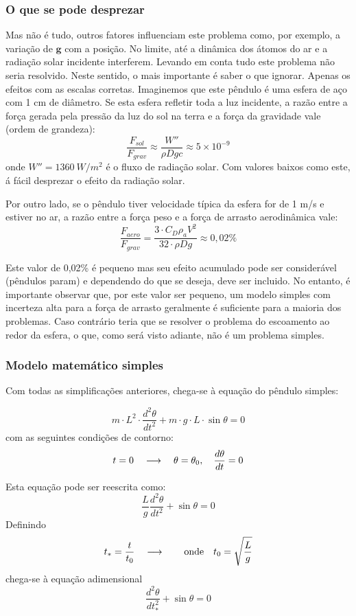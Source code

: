 \subsubsection{O que se pode desprezar}
Mas não é tudo, outros fatores influenciam este problema como, por exemplo, a variação de $\textbf{g}$ com a posição. No limite, até a dinâmica dos átomos do ar e a radiação solar incidente interferem. Levando em conta tudo este problema não seria resolvido. Neste sentido, o mais importante é saber o que ignorar. Apenas os efeitos com as escalas corretas. Imaginemos que este pêndulo é uma esfera de aço com 1 cm de diâmetro. Se esta esfera refletir toda a luz incidente, a razão entre a força gerada pela pressão da luz do sol na terra e a força da gravidade vale (ordem de grandeza):
\[
\frac{F_{sol}}{F_{grav}} \approx \frac{W''}{\rho D g c} \approx 5\times 10^{-9}
\]
onde $W''=1360\:W/m^2$ é o fluxo de radiação solar. Com valores baixos como este, á fácil desprezar o efeito da radiação solar. 

Por outro lado, se o pêndulo tiver velocidade típica da esfera for de 1 m/s e estiver no ar, a razão entre a força peso e a força de arrasto aerodinâmica vale:
\[
\frac{F_{aero}}{F_{grav}} = \frac{3\cdot C_D \rho_a V^2}{32\cdot\rho D g} \approx 0,02\%
\]

Este valor de 0,02\% é pequeno mas seu efeito acumulado pode ser considerável (pêndulos param) e dependendo do que se deseja, deve ser incluido. No entanto, é importante observar que, por este valor ser pequeno, um modelo simples com incerteza alta para a força de arrasto geralmente é suficiente para a maioria dos problemas. Caso contrário teria que se resolver o problema do escoamento ao redor da esfera, o que, como será visto adiante, não é um problema simples.

\subsubsection{Modelo matemático simples}
Com todas as simplificações anteriores, chega-se à equação do pêndulo simples:

\[
m\cdot L^2\cdot\frac{d^2\theta}{dt^2} + m\cdot g\cdot L\cdot \sin\theta = 0
\]
com as seguintes condições de contorno:
\[
t = 0 \quad\longrightarrow\quad \theta=\theta_0, \quad\frac{d\theta}{dt} = 0
\]

Esta equação pode ser reescrita como:
\[
\frac{L}{g}\frac{d^2\theta}{dt^2} + \sin\theta = 0 
\]
Definindo 
\[
t_* = \frac{t}{t_0}\quad\longrightarrow\quad \quad\text{onde}\quad t_0 = \sqrt{\frac{L}{g}}
\]
chega-se à equação adimensional
\[
\frac{d^2\theta}{dt_*^2} + \sin\theta = 0 
\]

